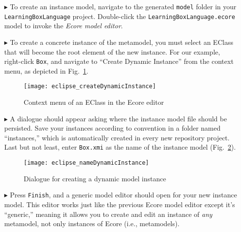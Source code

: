 \begin{itemize}

\item[$\blacktriangleright$] To create an instance model, navigate to the generated \texttt{model} folder in your \texttt{LearningBoxLanguage} project.
Double-click the \texttt{LearningBoxLa\-nguage.ecore} model to invoke  the \emph{Ecore model editor}. 

\vspace{0.5cm}

\item[$\blacktriangleright$] To create a concrete instance of the metamodel, you must select an EClass that will become the root element of the new instance.
For our example, right-click \texttt{Box}, and navigate to ``Create Dynamic Instance'' from the context menu, as depicted in Fig.~\ref{fig:context_menu}.

\begin{figure}[htbp]
	\centering
  \texttt{[image: eclipse\_createDynamicInstance]}
	\caption{Context menu of an EClass in the Ecore editor}
	\label{fig:context_menu}
\end{figure}

\vspace{0.5cm}

\item[$\blacktriangleright$] A dialogue should appear asking where the instance model file should be persisted. Save your instances according to convention in a
folder named ``instances,'' which is automatically created in every new repository project. Last but not least, enter \texttt{Box.xmi} as the name of the
instance model (Fig.~\ref{fig:store_dynamic_instance}).

\vspace{0.5cm}

\begin{figure}[htbp]
	\centering
  \texttt{[image: eclipse\_nameDynamicInstance]}
	\caption{Dialogue for creating a dynamic model instance}
	\label{fig:store_dynamic_instance}
\end{figure}

\item[$\blacktriangleright$] Press \texttt{Finish}, and a generic model editor should open for your new instance model. This editor works just like the
previous Ecore model editor except it's ``generic,'' meaning it allows you to create and edit an instance of \emph{any} metamodel, not only instances of Ecore
(i.e., metamodels).


\end{itemize}
